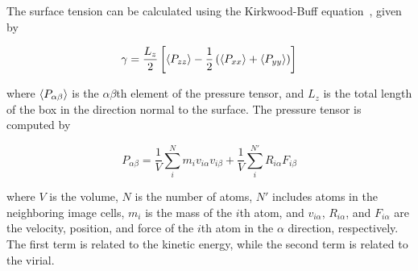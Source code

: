 \begin{itemize}
          The surface tension can be calculated using the Kirkwood-Buff equation~\cite{kirkwood1949}, given by

          \begin{equation} \gamma = \frac{L_z}{2} \left[ \expval{P_{zz}} - \frac{1}{2} \left( \expval{P_{xx}} + \expval{P_{yy}} \right) \right] \label{eq:surf_tens}
          \end{equation}

          where $\expval{P_{\alpha \beta}}$ is the $\alpha \beta$th element of the pressure tensor, and $L_z$ is the total length of the box in the direction normal to the surface. The pressure tensor is computed by~\cite{thompson2009general}

          \begin{equation} P_{\alpha \beta} = \frac{1}{V} \sum_i^N m_i v_{i\alpha} v_{i\beta} + \frac{1}{V} \sum_i^{N'} R_{i\alpha} F_{i\beta} \end{equation}

          where $V$ is the volume, $N$ is the number of atoms, $N'$ includes atoms in the neighboring image cells, $m_i$ is the mass of the $i$th atom, and $v_{i\alpha}$, $R_{i\alpha}$, and $F_{i\alpha}$ are the velocity, position, and force of the $i$th atom in the $\alpha$ direction, respectively. The first term is related to the kinetic energy, while the second term is related to the virial.


\end{itemize}
